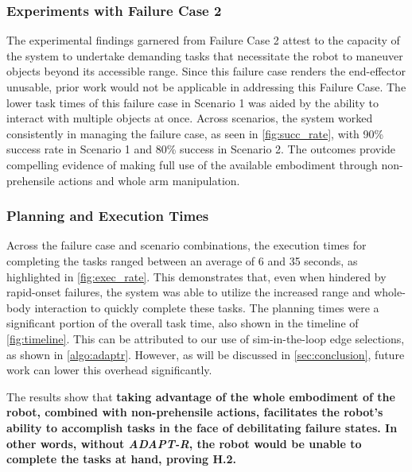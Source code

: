 \subsubsection{Experiments with Failure Case 2} The experimental findings garnered from Failure Case 2 attest to the capacity of the system to undertake demanding tasks that necessitate the robot to maneuver objects beyond its accessible range. Since this failure case renders the end-effector unusable, prior work \cite{brooks2016analysis} would not be applicable in addressing this Failure Case. The lower task times of this failure case in Scenario 1 was aided by the ability to interact with multiple objects at once. Across scenarios, the system worked consistently in managing the failure case, as seen in \cref{fig:succ_rate}, with 90\% success rate in Scenario 1 and 80\% success in Scenario 2. The outcomes provide compelling evidence of making full use of the available embodiment through non-prehensile actions and whole arm manipulation.

\subsubsection{Planning and Execution Times} Across the failure case and scenario combinations, the execution times for completing the tasks ranged between an average of 6 and 35 seconds, as highlighted in \cref{fig:exec_rate}. This demonstrates that, even when hindered by rapid-onset failures, the system was able to utilize the increased range and whole-body interaction to quickly complete these tasks. The planning times were a significant portion of the overall task time, also shown in the timeline of \cref{fig:timeline}. This can be attributed to our use of sim-in-the-loop edge selections, as shown in \cref{algo:adaptr}. However, as will be discussed in \cref{sec:conclusion}, future work can lower this overhead significantly.

The results show that \textbf{taking advantage of the whole embodiment of the robot, combined with non-prehensile actions, facilitates the robot's ability to accomplish tasks in the face of debilitating failure states. In other words, without \textit{ADAPT-R}, the robot would be unable to complete the tasks at hand, proving H.2.}